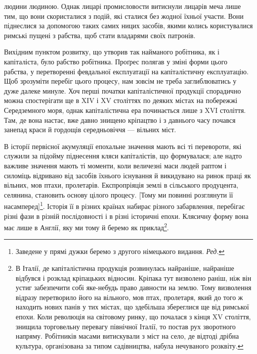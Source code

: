 \parcont{}  %
людини людиною. Однак лицарі промисловости витиснули лицарів
меча лише тим, що вони скористалися з подій, які сталися
без жодної їхньої участи. Вони піднеслися за допомогою таких
самих ницих засобів, якими колись користувалися римські пущені
з рабства, щоб стати владарями своїх патронів.

Вихідним пунктом розвитку, що утворив так найманого робітника,
як і капіталіста, було рабство робітника. Проґрес полягав
у зміні форми цього рабства, у перетворенні февдальної експлуатації
на капіталістичну експлуатацію. Щоб зрозуміти перебіг
цього процесу, нам зовсім не треба заглиблюватись у дуже
далеке минуле. Хоч перші початки капіталістичної продукції
спорадично можна спостерігати ще в XIV і XV століттях по
деяких містах на побережжі Середземного моря, однак капіталістична
ера починається лише з XVI століття. Там, де вона настає,
вже давно знищено кріпацтво і з давнього часу почався
занепад краси й гордощів середньовіччя — вільних міст.

В історії первісної акумуляції епохальне значення мають всі
ті перевороти, які служили за підойму піднесення кляси капіталістів,
що формувалася; але надто важливе значення мають
ті моменти, коли величезні маси людей раптом і силоміць відривано
від засобів їхнього існування й викидувано на ринок праці
як вільних, мов птахи, пролетарів. Експропріяція землі в сільського
продуцента, селянина, становить основу цілого процесу.
[Тому ми повинні розглянути її насамперед]\footnote*{
Заведене у прямі дужки беремо з другого німецького видання. \emph{Ред.}
}. Історія її в
різних країнах набирає різного забарвлення, перебігає різні
фази в різній послідовності і в різні історичні епохи. Клясичну
форму вона має лише в Англії, яку ми тому й беремо як приклад\footnote{
В Італії, де капіталістична продукція розвинулась найраніше,
найраніше відбувся і розклад кріпацьких відносин. Кріпака тут визволено
раніш, ніж він устиг забезпечити собі яке-небудь право давности на
землю. Тому визволення відразу перетворило його на вільного, мов
птах, пролетаря, який до того ж находить нових панів у тих містах, що
здебільша збереглися ще від римської епохи. Коли революція на світовому
ринку, що почалася з кінця XV століття, знищила торговельну
перевагу північної Італії, то постав рух зворотного напряму. Робітників
масами витискували з міст на село, де відтоді дрібна культура, організована
за типом садівництва, набула нечуваного розквіту.
}.

